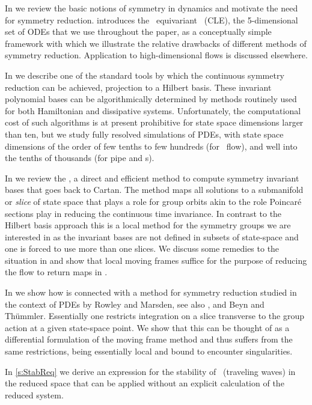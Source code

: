 In  we review the basic notions of symmetry
in dynamics and motivate the need for symmetry reduction.
 introduces the \ equivariant
\cLe\ (CLE), the 5-dimensional set of ODEs that we use
throughout the paper, as a conceptually  simple framework
with which we illustrate the relative drawbacks of different
methods of symmetry reduction. Application to
high-dimensional flows is discussed
elsewhere.

In  we describe one of the standard tools
by which the continuous symmetry reduction can be achieved,
projection to a Hilbert basis. These invariant polynomial
bases can be algorithmically determined by methods routinely
used for both Hamiltonian and dissipative systems.
Unfortunately, the computational cost of such algorithms is
at present prohibitive for state space dimensions larger than
ten, but we study fully resolved simulations of PDEs, with
state space dimensions of the order of few tenths to few
hundreds (for \KS\ flow), and well into the tenths of
thousands (for pipe and \pCf s).

In  we review the \emph{\mframes}, a direct
and efficient method to compute symmetry invariant bases that
goes back to Cartan. The method maps all solutions to a
submanifold or \emph{slice} of state space that plays a role
for group orbits akin to the role Poincar\'e sections play in
reducing the continuous time invariance. In contrast to the
Hilbert basis approach this is a local method for the
symmetry groups we are interested in as the invariant bases
are not defined in subsets of state-space and one is forced
to use more than one slices. We discuss some remedies to the
situation in 
and show that local moving frames suffice for the purpose of
reducing the flow to return maps in .

In  we show how {\mframes} is
connected with a method for symmetry reduction studied in the
context of PDEs by Rowley and
Marsden, see also
, and Beyn and
Th\"ummler.
Essentially one restricts integration on a slice transverse
to the group action at a given state-space point. We show
that this can be thought of as a differential formulation of
the moving frame method and thus suffers from the same
restrictions, being essentially local and bound to encounter
singularities.

In \ref{s:StabReq} we derive an expression for the stability
of \reqva\ (traveling waves) in the reduced space 
that can be applied without an explicit
calculation of the reduced system.
